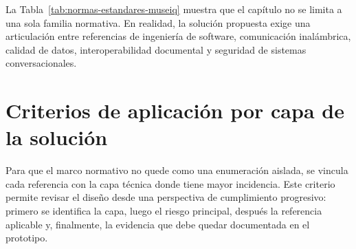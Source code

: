 La Tabla~\ref{tab:normas-estandares-museiq} muestra que el capítulo no se limita a una sola familia normativa. En realidad, la solución propuesta exige una articulación entre referencias de ingeniería de software, comunicación inalámbrica, calidad de datos, interoperabilidad documental y seguridad de sistemas conversacionales.

\section{Criterios de aplicación por capa de la solución}

Para que el marco normativo no quede como una enumeración aislada, se vincula cada referencia con la capa técnica donde tiene mayor incidencia. Este criterio permite revisar el diseño desde una perspectiva de cumplimiento progresivo: primero se identifica la capa, luego el riesgo principal, después la referencia aplicable y, finalmente, la evidencia que debe quedar documentada en el prototipo.

